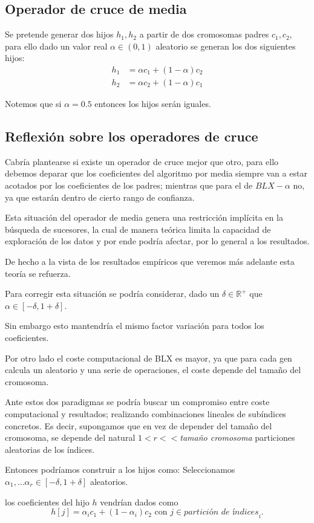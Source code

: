 \subsection{ Operador de cruce de media}   

Se pretende generar dos hijos $h_1, h_2$ a partir de dos cromosomas padres $c_1, c_2$, para ello 
dado un valor real $\alpha \in (0,1)$ aleatorio se generan los dos siguientes hijos: 
\begin{align*}
  h_1 &= \alpha c_1 + (1-\alpha ) c_2  \\
  h_2 &= \alpha c_2 + (1-\alpha ) c_1 
\end{align*}

Notemos que si $\alpha = 0.5$ entonces los hijos serán iguales. 

\subsection{Reflexión sobre los operadores de cruce}  

Cabría plantearse si existe un operador de cruce mejor que otro, 
para ello debemos deparar que 
los coeficientes del algoritmo por media siempre van a estar acotados por los coeficientes de los padres; mientras que para el de $BLX-\alpha$ no, 
ya que estarán dentro de cierto rango de confianza. 

Esta situación del operador de media genera una restricción implícita en la búsqueda de sucesores, la cual de manera teórica limita la capacidad de exploración de los datos y por ende podría afectar, por lo general a los resultados. 

De hecho a la vista de los resultados empíricos que veremos más adelante
esta teoría se refuerza.

Para corregir esta situación se podría considerar, dado un $\delta \in \mathbb{R}^+$  que $\alpha \in [-\delta, 1+\delta]$.   

Sin embargo esto mantendría el mismo factor variación para todos los coeficientes. 

Por otro lado el coste computacional de BLX es mayor, ya que para cada gen calcula un aleatorio y una serie de operaciones, el coste depende del tamaño del cromosoma. 

Ante estos dos paradigmas se podría buscar un compromiso entre 
coste computacional y resultados; realizando combinaciones lineales 
de subíndices concretos.  Es decir, supongamos que en vez de depender
del tamaño del cromosoma, se depende del natural $1 <r <<$\textit{tamaño cromosoma}  particiones aleatorias de los 
índices. 

Entonces podríamos construir a los hijos como:
Seleccionamos $\alpha_1, \ldots \alpha_r \in [-\delta, 1+\delta]$ aleatorios. 

los coeficientes del hijo $h$ vendrían dados como
\begin{equation*}
  h[j] = \alpha_i c_1  + (1-\alpha_i)c_2 \text{ con } j \in \textit{partición de índices}_i.
\end{equation*}